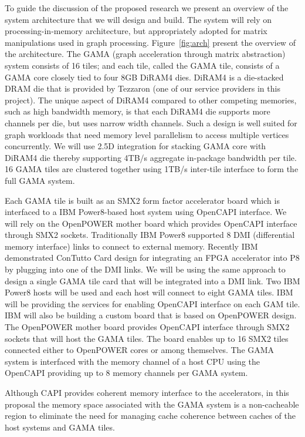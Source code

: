 \noindent 
To guide the discussion of the proposed research we present an overview of the system architecture that we will design and build. The system will rely on processing-in-memory architecture, but appropriately adopted for matrix manipulations used in graph processing.   Figure~\ref{fig:arch} present the overview of the architecture. The GAMA (graph acceleration through matrix abstraction) system consists of 16 tiles; and each tile, called the GAMA tile,  consists of a GAMA core closely tied to four 8GB DiRAM4 dies. DiRAM4 is a die-stacked DRAM die that is provided by Tezzaron (one of our service providers in this project). The unique aspect of DiRAM4 compared to other competing memories, such as high bandwidth memory, is that each DiRAM4 die supports more channels per die, but uses narrow width channels. Such a design is well suited for graph workloads that need memory level parallelism to access multiple vertices concurrently. We will use 2.5D integration for stacking GAMA core with DiRAM4 die thereby supporting 4TB/s aggregate in-package bandwidth per tile.  16 GAMA tiles are clustered together using 1TB/s inter-tile interface to form the full GAMA system. 

Each GAMA tile is  built as an SMX2 form factor accelerator board which is interfaced to a IBM Power8-based host system using OpenCAPI interface. We will rely on  the OpenPOWER mother board which provides OpenCAPI interface through SMX2 sockets.  Traditionally IBM Power8 supported 8 DMI (differential memory interface) links  to connect to external memory. Recently IBM demonstrated ConTutto Card design for integrating an FPGA accelerator into P8 by plugging into one of the DMI links. We will be using the same approach to design a single GAMA tile card that will be integrated into a DMI link. Two IBM Power8 hosts will be used and each host will connect to eight GAMA tiles.  IBM will be providing the services for enabling OpenCAPI interface on each GAM tile. IBM will also be building a custom board that is based on OpenPOWER design. 
The OpenPOWER mother board provides OpenCAPI interface through SMX2 sockets that will host the GAMA tiles. The board enables up to 16 SMX2 tiles connected either to OpenPOWER cores or among themselves. The GAMA  system is interfaced with the memory channel of a host CPU using the OpenCAPI providing up to 8 memory channels per GAMA system.

Although CAPI provides coherent memory interface to the accelerators, in this proposal the memory space associated with the GAMA system is a non-cacheable region to  eliminate the need for managing cache coherence between caches of the host systems and GAMA tiles. 

